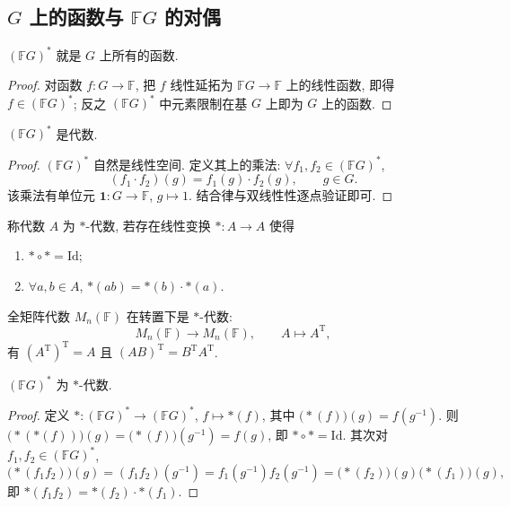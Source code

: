 \subsection{$G$ 上的函数与 $\mathbb{F}G$ 的对偶}

\begin{proposition}\label{prop:dual-is-functions}
$(\mathbb{F}G)^*$ 就是 $G$ 上所有的函数.
\end{proposition}

\begin{proof}
对函数 $f\colon G\to\mathbb{F}$, 把 $f$ 线性延拓为 $\mathbb{F}G\to\mathbb{F}$ 上的线性函数,
即得 $f\in(\mathbb{F}G)^*$; 反之 $(\mathbb{F}G)^*$ 中元素限制在基 $G$ 上即为 $G$ 上的函数.
\end{proof}

\begin{lemma}\label{lem:dual-algebra}
$(\mathbb{F}G)^*$ 是代数.
\end{lemma}

\begin{proof}
$(\mathbb{F}G)^*$ 自然是线性空间. 定义其上的乘法: $\forall f_1,f_2\in(\mathbb{F}G)^*$,
\[
  (f_1\cdot f_2)(g)=f_1(g)\cdot f_2(g),\qquad g\in G .
\]
该乘法有单位元 $\mathbf{1}\colon G\to\mathbb{F}$, $g\mapsto 1$. 结合律与双线性性逐点验证即可.
\end{proof}

\begin{definition}[$*$-代数]\label{def:star-algebra}
称代数 $A$ 为 $*$-代数, 若存在线性变换 $*\colon A\to A$ 使得
\begin{enumerate}
  \item $*\circ *=\mathrm{Id}$;
  \item $\forall a,b\in A$, $*(ab)=*(b)\cdot *(a)$.
\end{enumerate}
\end{definition}

\begin{example}\label{ex:transpose-star-algebra}
全矩阵代数 $M_n(\mathbb{F})$ 在转置下是 $*$-代数:
\[
  M_n(\mathbb{F})\to M_n(\mathbb{F}),\qquad A\longmapsto A^{\mathrm{T}},
\]
有 $(A^{\mathrm{T}})^{\mathrm{T}}=A$ 且 $(AB)^{\mathrm{T}}=B^{\mathrm{T}}A^{\mathrm{T}}$.
\end{example}

\begin{proposition}\label{prop:dual-star}
$(\mathbb{F}G)^*$ 为 $*$-代数.
\end{proposition}

\begin{proof}
定义 $*\colon(\mathbb{F}G)^*\to(\mathbb{F}G)^*$, $f\mapsto *(f)$, 其中
$\bigl(*(f)\bigr)(g)=f(g^{-1})$. 则
$\bigl(*(*(f))\bigr)(g)=\bigl(*(f)\bigr)(g^{-1})=f(g)$, 即 $*\circ *=\mathrm{Id}$.
其次对 $f_1,f_2\in(\mathbb{F}G)^*$,
\[
  \bigl(*(f_1f_2)\bigr)(g)=(f_1f_2)(g^{-1})=f_1(g^{-1})f_2(g^{-1})
  =\bigl(*(f_2)\bigr)(g)\bigl(*(f_1)\bigr)(g),
\]
即 $*(f_1f_2)=*(f_2)\cdot *(f_1)$.
\end{proof}

